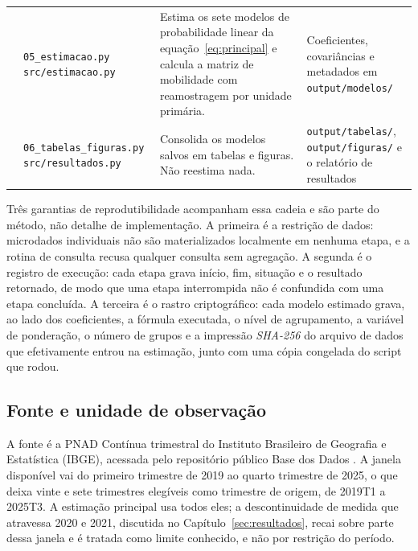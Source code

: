 \begin{quadro}[htbp]
\begin{tabular}{@{}p{0.9cm}p{3.9cm}p{4.5cm}p{5.0cm}@{}}
    \addlinespace[2pt]
    05 & \texttt{05\_estimacao.py} \newline \texttt{src/estimacao.py}
       & Estima os sete modelos de probabilidade linear da
         equação~\eqref{eq:principal} e calcula a matriz de mobilidade com
         reamostragem por unidade primária.
       & Coeficientes, covariâncias e metadados em \texttt{output/modelos/} \\
    \addlinespace[2pt]
    06 & \texttt{06\_tabelas\_figuras.py} \newline \texttt{src/resultados.py}
       & Consolida os modelos salvos em tabelas e figuras. Não reestima nada.
       & \texttt{output/tabelas/}, \texttt{output/figuras/} e o relatório de resultados \\
    \bottomrule
  \end{tabular}
\end{quadro}

Três garantias de reprodutibilidade acompanham essa cadeia e são parte do
método, não detalhe de implementação. A primeira é a restrição de dados:
microdados individuais não são materializados localmente em nenhuma etapa, e a
rotina de consulta recusa qualquer consulta sem agregação. A segunda é o
registro de execução: cada etapa grava início, fim, situação e o resultado
retornado, de modo que uma etapa interrompida não é confundida com uma etapa
concluída. A terceira é o rastro criptográfico: cada modelo estimado grava, ao
lado dos coeficientes, a fórmula executada, o nível de agrupamento, a variável
de ponderação, o número de grupos e a impressão \textit{SHA-256} do arquivo de
dados que efetivamente entrou na estimação, junto com uma cópia congelada do
script que rodou.

\subsection{Fonte e unidade de observação}

A fonte é a PNAD Contínua trimestral do Instituto Brasileiro de Geografia e
Estatística (IBGE), acessada pelo repositório público Base dos Dados
\parencite{basedosdados_pnadc}. A janela disponível vai do primeiro trimestre de
2019 ao quarto trimestre de 2025, o que deixa vinte e sete trimestres elegíveis
como trimestre de origem, de 2019T1 a 2025T3. A estimação principal usa todos
eles; a descontinuidade de medida que atravessa 2020 e 2021, discutida no
Capítulo~\ref{sec:resultados}, recai sobre parte dessa janela e é tratada como
limite conhecido, e não por restrição do período.

